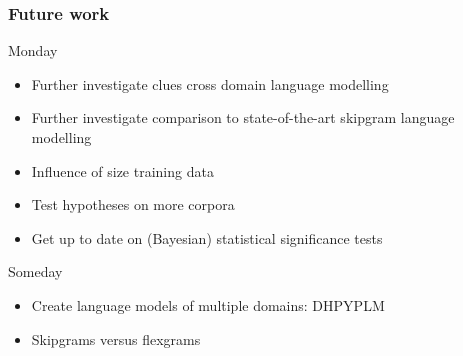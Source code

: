 \begin{frame}
    \frametitle{Future work}

    \begin{block}{Monday}
        \begin{itemize}
            \item Further investigate clues cross domain language modelling
            \item Further investigate comparison to state-of-the-art skipgram language modelling
            \item Influence of size training data
            \item Test hypotheses on more corpora
            \item Get up to date on (Bayesian) statistical significance tests
        \end{itemize}
    \end{block}

    \begin{block}{Someday}
        \begin{itemize}
            \item Create language models of multiple domains: DHPYPLM
            \item Skipgrams versus flexgrams
        \end{itemize}
    \end{block}
\end{frame}
\note{

}

